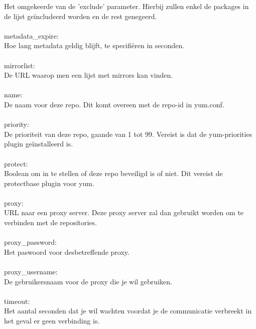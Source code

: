 Het omgekeerde van de 'exclude' parameter. Hierbij zullen enkel de packages in de lijst ge\"includeerd worden en de rest genegeerd.\\\\
%
metadata\_expire:\\
Hoe lang metadata geldig blijft, te specifi\"eren in seconden.\\\\
%
mirrorlist:\\
De URL waarop men een lijst met mirrors kan vinden.\\\\
%
name:\\
De naam voor deze repo. Dit komt overeen met de repo-id in yum.conf.\\\\
%
priority:\\
De prioriteit van deze repo, gaande van 1 tot 99. Vereist is dat de yum-priorities plugin ge\"installeerd is.\\\\
%
protect:\\
Boolean om in te stellen of deze repo beveiligd is of niet. Dit vereist de protectbase plugin voor yum.\\\\
%
proxy:\\
URL naar een proxy server. Deze proxy server zal dan gebruikt worden om te verbinden met de repositories.\\\\
%
proxy\_password:\\
Het paswoord voor desbetreffende proxy.\\\\
%
proxy\_username:\\
De gebruikersnaam voor de proxy die je wil gebruiken.\\\\
%
timeout:\\
Het aantal seconden dat je wil wachten voordat je de communicatie verbreekt in het geval er geen verbinding is.\\\\
